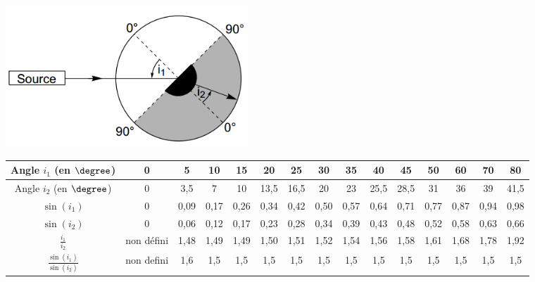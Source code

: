 \begin{multicols}{2}
\\
\begin{center}
    \includegraphics[width=0.4\textwidth]{Images/Schema_exp2.PNG}
\end{center}
\end{multicols}


\begin{center}
    \begin{tabular}{|C{0.1}|C{0.04}|C{0.04}|C{0.04}|C{0.04}|C{0.04}|C{0.04}|C{0.04}|C{0.04}|C{0.04}|C{0.04}|C{0.04}|C{0.04}|C{0.04}|C{0.04}|}
    \hline
        Angle $i_1$ (en $\degree$) & 0 & 5 & 10 & 15 & 20 & 25 & 30 & 35 & 40 & 45 & 50 & 60 & 70 & 80 \\
        \hline
        Angle $i_2$ (en $\degree$) & 0 & 3,5 & 7 & 10 & 13,5  & 16,5 & 20 & 23 & 25,5 & 28,5 & 31 & 36 & 39 & 41,5    \\
        \hline
        $\sin\left(i_1\right)$ & 0 & 0,09 & 0,17 & 0,26 & 0,34  & 0,42  & 0,50 & 0,57 & 0,64 & 0,71 & 0,77 & 0,87 & 0,94  & 0,98 \\
        \hline
        $\sin\left(i_2\right)$ & 0 & 0,06 & 0,12 & 0,17  & 0,23  & 0,28 & 0,34 & 0,39  & 0,43 & 0,48  & 0,52 & 0,58  & 0,63 & 0,66 \\
        \hline
        $\frac{i_1}{i_2}$ & non défini & 1,48 & 1,49 & 1,49 & 1,50 & 1,51 & 1,52 & 1,54 & 1,56 & 1,58 & 1,61 & 1,68 & 1,78 & 1,92  \\
        \hline
       $\frac{\sin\left(i_1\right)}{\sin\left(i_2\right)}$ & non defini & 1,6 & 1,5 & 1,5 & 1,5 & 1,5  & 1,5 &1,5  &1,5  &  1,5& 1,5 & 1,5  & 1,5 & 1,5  \\
        \hline
    \end{tabular}
\end{center}

